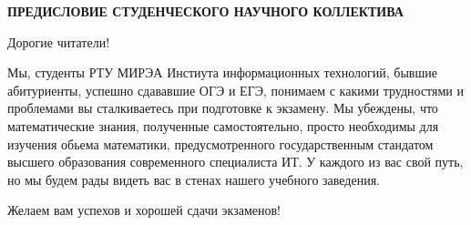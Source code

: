 {\centering \large \textbf{ПРЕДИСЛОВИЕ СТУДЕНЧЕСКОГО НАУЧНОГО КОЛЛЕКТИВА}
	
}

Дорогие читатели! 

Мы, студенты РТУ МИРЭА Инстиута информационных технологий, бывшие абитуриенты, успешно сдававшие ОГЭ и ЕГЭ, понимаем с какими трудностями и проблемами вы сталкиваетесь при подготовке к экзамену. Мы убеждены, что математические знания, полученные самостоятельно, просто необходимы для изучения обьема математики, предусмотренного государственным стандатом высшего образования современного специалиста ИТ. У каждого из вас свой путь, но мы будем рады видеть вас в стенах нашего учебного заведения.

Желаем вам успехов и хорошей сдачи экзаменов!
